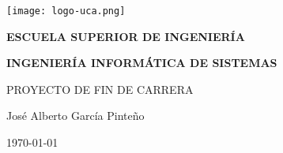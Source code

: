 


\begin{titlepage}

  \begin{center}

    \texttt{[image: logo-uca.png]} \\
    
    \vspace{2.5cm}
    
    \LARGE{\textbf{ESCUELA SUPERIOR DE INGENIERÍA}} \\
    
    \vspace{1.0cm}
    
    \Large{\textbf{INGENIERÍA INFORMÁTICA DE SISTEMAS}} \\
    
    \vspace{3.0cm}
    
    \Large{PROYECTO DE FIN DE CARRERA} \\
    
    \vspace{2.5cm}
    
    \Large{José Alberto García Pinteño} \\
  
    \vspace{0.5cm}

    \large{\today}
    
  \end{center}
\end{titlepage}
